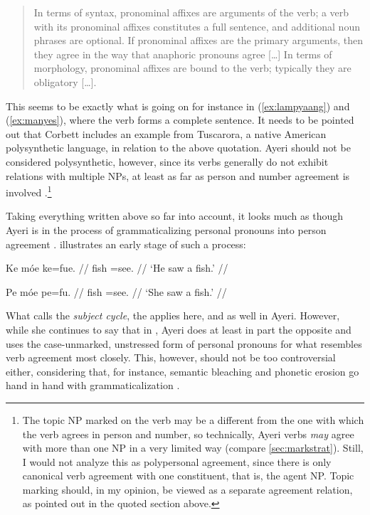 \blockcquote[99--100]{corbett2006}{In terms of syntax, pronominal affixes are
arguments of the verb; a verb with its pronominal affixes constitutes a full
sentence, and additional noun phrases are optional. If pronominal affixes are
the primary arguments, then they agree in the way that anaphoric pronouns agree
[…] In terms of morphology, pronominal affixes are bound to the verb; typically
they are obligatory […].}

\noindent This seems to be exactly what is going on for instance in
(\ref{ex:lampyaang}) and (\ref{ex:manyes}), where the verb forms a complete
sentence. It needs to be pointed out that Corbett includes an example from
Tuscarora, a native American polysynthetic language, in relation to the above
quotation. Ayeri should not be considered polysynthetic, however, since its
verbs generally do not exhibit relations with multiple NPs, at least as far as
person and number agreement is involved
\citep[45--46]{comrie1989}.\footnote{The topic NP marked on the verb may be a
different from the one with which the verb agrees in person and number, so
technically, Ayeri verbs \emph{may} agree with more than one NP in a very
limited way (compare \autoref{sec:markstrat}). Still, I would not analyze this
as polypersonal agreement, since there is only canonical verb agreement with
one constituent, that is, the agent NP. Topic marking should, in my opinion, be
viewed as a separate agreement relation, as pointed out in the quoted section
above.}

Taking everything written above so far into account, it looks much as though 
Ayeri is in the process of grammaticalizing personal pronouns into person 
agreement \parencites[42--45]{lehmann2015}[493--497]{vangelderen2011}. 
\citet[76--77]{corbett2006} illustrates an early stage of such a process:

\pex %
\a\begingl{}%
	\gla Ke móe ke=fue.  //
	\glb \TsgM{} fish \TsgM{}=​see.\TsgM{} {} //
	\glft `He saw a fish.' //
\endgl

\a\begingl
	\gla Pe móe pe=fu.  //
	\glb \TsgF{} fish \TsgF{}=​see.\TsgF{} {} //
	\glft `She saw a fish.' //
\endgl

\xe

What \citeauthor{vangelderen2011} calls the \emph{subject cycle}, the
 applies here, and as well in
Ayeri. However, while she continues to say that in
, Ayeri does at least in part the
opposite and uses the case-unmarked, unstressed form of personal pronouns for
what resembles verb agreement most closely. This, however, should not be too
controversial either, considering that, for instance, semantic bleaching and
phonetic erosion go hand in hand with grammaticalization
\parencites[136--137]{lehmann2015}[497]{vangelderen2011}.

